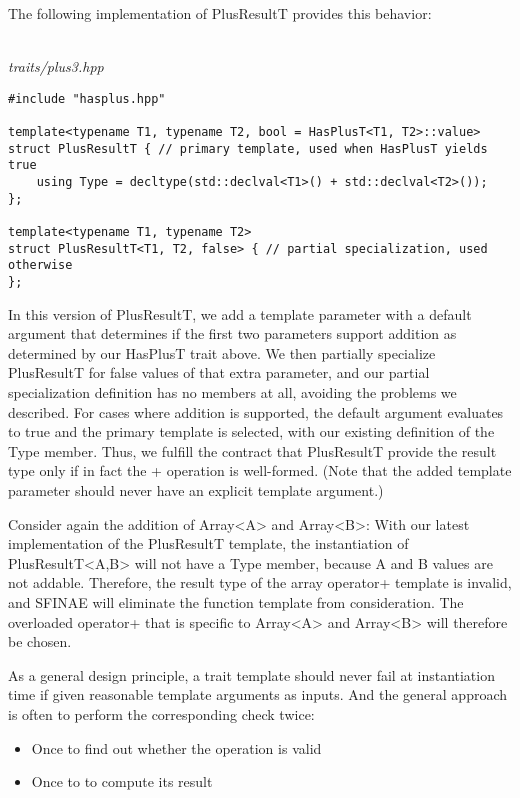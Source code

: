 The following implementation of PlusResultT provides this behavior:

\hspace*{\fill} \\ %
\noindent
\textit{traits/plus3.hpp}
\begin{lstlisting}[style=styleCXX]
#include "hasplus.hpp"

template<typename T1, typename T2, bool = HasPlusT<T1, T2>::value>
struct PlusResultT { // primary template, used when HasPlusT yields true
	using Type = decltype(std::declval<T1>() + std::declval<T2>());
};

template<typename T1, typename T2>
struct PlusResultT<T1, T2, false> { // partial specialization, used otherwise
};
\end{lstlisting}

In this version of PlusResultT, we add a template parameter with a default argument that determines if the first two parameters support addition as determined by our HasPlusT trait above. We then partially specialize PlusResultT for false values of that extra parameter, and our partial specialization definition has no members at all, avoiding the problems we described. For cases where addition is supported, the default argument evaluates to true and the primary template is selected, with our existing definition of the Type member. Thus, we fulfill the contract that PlusResultT provide the result type only if in fact the + operation is well-formed. (Note that the added template parameter should never have an explicit template argument.)

Consider again the addition of Array<A> and Array<B>: With our latest implementation of the PlusResultT template, the instantiation of  PlusResultT<A,B> will not have a Type member, because A and B values are not addable. Therefore, the result type of the array operator+ template is invalid, and SFINAE will eliminate the function template from consideration. The overloaded operator+ that is specific to Array<A> and Array<B> will therefore be chosen.

As a general design principle, a trait template should never fail at instantiation time if given reasonable template arguments as inputs. And the general approach is often to perform the corresponding check twice:

\begin{itemize}
\item
Once to find out whether the operation is valid

\item
Once to to compute its result
\end{itemize}

